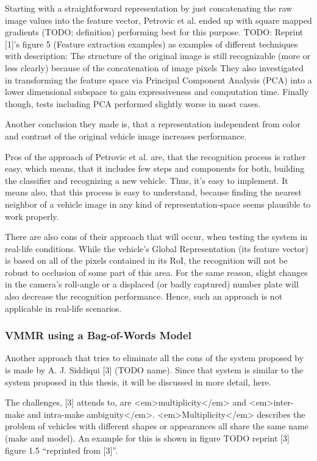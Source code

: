 Starting with a straightforward representation by just concatenating the raw image values into the feature vector, Petrovic et al. ended up with square mapped gradients (TODO: definition) performing best for this purpose. TODO: Reprint [1]’s figure 5 (Feature extraction examples) as examples of different techniques with description: The structure of the original image is still recognizable (more or less clearly) because of the concatenation of image pixels
They also investigated in transforming the feature space via Principal Component Analysis (PCA) into a lower dimensional subspace to gain expressiveness and computation time. Finally though, tests including PCA performed slightly worse in most cases.

Another conclusion they made is, that a representation independent from color and contrast of the original vehicle image increases performance.

Pros of the approach of Petrovic et al. are, that the recognition process is rather easy, which means, that it includes few steps and components for both, building the classifier and recognizing a new vehicle. Thus, it’s easy to implement. It means also, that this process is easy to understand, because finding the nearest neighbor of a vehicle image in any kind of representation-space seems plausible to work properly.

There are also cons of their approach that will occur, when testing the system in real-life conditions. While the vehicle’s Global Representation (its feature vector) is based on all of the pixels contained in its RoI, the recognition will not be robust to occlusion of some part of this area. For the same reason, slight changes in the camera’s roll-angle or a displaced (or badly captured) number plate will also decrease the recognition performance. Hence, such an approach is not applicable in real-life scenarios.

\subsubsection{VMMR using a Bag-of-Words Model}
Another approach that tries to eliminate all the cons of the system proposed by \citeauthor{petrovic2004analysis} is made by A. J. Siddiqui [3] (TODO name). Since that system is similar to the system proposed in this thesis, it will be discussed in more detail, here.

The challenges, [3] attends to, are <em>multiplicity</em> and <em>inter-make and intra-make ambiguity</em>. <em>Multiplicity</em> describes the problem of vehicles with different shapes or appearances all share the same name (make and model). An example for this is shown in figure TODO reprint [3] figure 1.5 “reprinted from [3]”.

